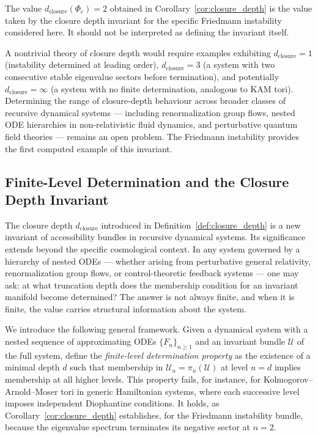 \documentclass[12pt,a4paper]{article}
\theoremstyle{plain}
\theoremstyle{definition}
\theoremstyle{remark}
\newcommand{\Phic}{\Phi_c}
\newcommand{\piproj}{\pi}
\newcommand{\dclos}{d_{\mathrm{closure}}}
\begin{document}
The value $\dclos(\Phic) = 2$ obtained in Corollary~\ref{cor:closure_depth} is
the value taken by the closure depth invariant for the specific Friedmann instability
considered here. It should not be interpreted as defining the invariant itself.

A nontrivial theory of closure depth would require examples exhibiting
$\dclos = 1$ (instability determined at leading order), $\dclos = 3$ (a system
with two consecutive stable eigenvalue sectors before termination), and potentially
$\dclos = \infty$ (a system with no finite determination, analogous to KAM tori).
Determining the range of closure-depth behaviour across broader classes of recursive
dynamical systems --- including renormalization group flows, nested ODE hierarchies
in non-relativistic fluid dynamics, and perturbative quantum field theories ---
remains an open problem. The Friedmann instability provides the first computed
example of this invariant.

\subsection{Finite-Level Determination and the Closure Depth Invariant}
\label{subsec:clio}

The closure depth $\dclos$ introduced in Definition~\ref{def:closure_depth}
is a new invariant of accessibility bundles in recursive dynamical systems.
Its significance extends beyond the specific cosmological context. In any
system governed by a hierarchy of nested ODEs --- whether arising from
perturbative general relativity, renormalization group flows, or control-theoretic
feedback systems --- one may ask: at what truncation depth does the membership
condition for an invariant manifold become determined? The answer is not always
finite, and when it is finite, the value carries structural information about
the system.

We introduce the following general framework. Given a dynamical system with a
nested sequence of approximating ODEs $\{F_n\}_{n\geq 1}$ and an invariant
bundle $\mathcal{U}$ of the full system, define the \emph{finite-level determination
property} as the existence of a minimal depth $d$ such that membership in
$\mathcal{U}_n = \piproj_n(\mathcal{U})$ at level $n=d$ implies membership
at all higher levels. This property fails, for instance, for Kolmogorov--Arnold--Moser
tori in generic Hamiltonian systems, where each successive level imposes independent
Diophantine conditions. It holds, as Corollary~\ref{cor:closure_depth} establishes,
for the Friedmann instability bundle, because the eigenvalue spectrum terminates its
negative sector at $n=2$.
\end{document}
